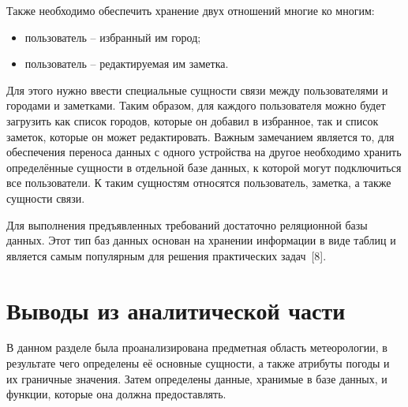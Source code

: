 Также необходимо обеспечить хранение двух отношений многие ко многим:
\begin{itemize}
    \item пользователь -- избранный им город;
    \item пользователь -- редактируемая им заметка.
\end{itemize}
Для этого нужно ввести специальные сущности связи между пользователями и городами и заметками.
Таким образом, для каждого пользователя можно будет загрузить как список городов, которые он добавил в избранное, так и список заметок, которые он может редактировать.
Важным замечанием является то, для обеспечения переноса данных с одного устройства на другое необходимо хранить определённые сущности в отдельной базе данных, к которой могут подключиться все пользователи.
К таким сущностям относятся пользователь, заметка, а также сущности связи.

Для выполнения предъявленных требований достаточно реляционной базы данных.
Этот тип баз данных основан на хранении информации в виде таблиц и является самым популярным для решения практических задач~[8].

\section*{Выводы из аналитической части}
В данном разделе была проанализирована предметная область метеорологии, в результате чего определены её основные сущности, а также атрибуты погоды и их граничные значения.
Затем определены данные, хранимые в базе данных, и функции, которые она должна предоставлять.